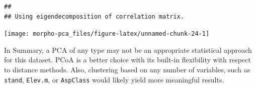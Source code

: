 \documentclass[]{article}
\begin{document}
\begin{verbatim}
## 
## Using eigendecomposition of correlation matrix.
\end{verbatim}

\begin{center}\texttt{[image: morpho-pca\_files/figure-latex/unnamed-chunk-24-1]} \end{center}

In Summary, a PCA of any type may not be an appropriate statistical
approach for this dataset. PCoA is a better choice with its built-in
flexibility with respect to distance methods. Also, clustering based on
any number of variables, such as \texttt{stand}, \texttt{Elev.m}, or
\texttt{AspClass} would likely yield more meaningful results.
\end{document}
